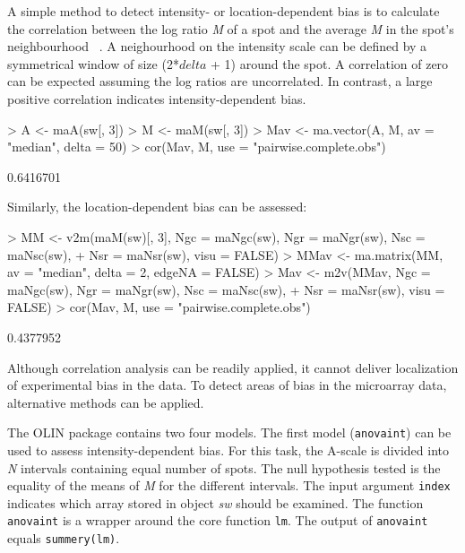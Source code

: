 \documentclass[a4paper,11pt]{article}
\begin{document}
A simple method to detect intensity- or location-dependent  bias is to calculate the 
correlation between the log ratio \emph{M} of a spot and the average \emph{M} in the spot's 
neighbourhood ~\cite{jo}. A neighourhood on the intensity scale can be defined by a symmetrical
window of size (2*$delta$ + 1) around the spot. A correlation of zero can be expected assuming
the log ratios are uncorrelated. In contrast, a large positive correlation indicates intensity-dependent
 bias.

\begin{Schunk}
\begin{Sinput}
> A <- maA(sw[, 3])
> M <- maM(sw[, 3])
> Mav <- ma.vector(A, M, av = "median", delta = 50)
> cor(Mav, M, use = "pairwise.complete.obs")
\end{Sinput}
\begin{Soutput}
          [,1]
[1,] 0.6416701
\end{Soutput}
\end{Schunk}

Similarly, the location-dependent bias can be assessed: 

\begin{Schunk}
\begin{Sinput}
> MM <- v2m(maM(sw)[, 3], Ngc = maNgc(sw), Ngr = maNgr(sw), Nsc = maNsc(sw),
+ Nsr = maNsr(sw), visu = FALSE)
> MMav <- ma.matrix(MM, av = "median", delta = 2, edgeNA = FALSE)
> Mav <- m2v(MMav, Ngc = maNgc(sw), Ngr = maNgr(sw), Nsc = maNsc(sw), 
+ Nsr = maNsr(sw), visu = FALSE)
> cor(Mav, M, use = "pairwise.complete.obs")
\end{Sinput}
\begin{Soutput}
          [,1]
[1,] 0.4377952
\end{Soutput}
\end{Schunk}

Although correlation analysis can be readily applied, it  cannot 
deliver localization of experimental bias in the data. 
To detect areas of bias in the microarray data, alternative methods can be applied. 

The OLIN package contains two four models. The first model (\texttt{anovaint}) can be used
to assess intensity-dependent bias. For this task, the A-scale is divided into \emph{N} intervals
containing equal number of spots. The null hypothesis tested is the equality of the means of \emph{M} for the different intervals.  The input argument \texttt{index} indicates which array stored in object \emph{sw}
 should
be examined. 
The function \texttt{anovaint}  is a wrapper around the core function \texttt{lm}. 
The output of  \texttt{anovaint} equals \texttt{summery(lm)}.
\end{document}
